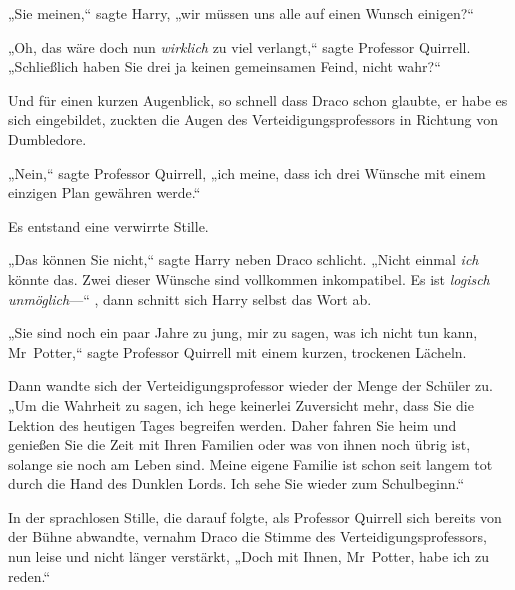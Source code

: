 „Sie meinen,“ sagte Harry, „wir müssen uns alle auf einen Wunsch einigen?“

„Oh, das wäre doch nun \emph{wirklich} zu viel verlangt,“ sagte Professor Quirrell. „Schließlich haben Sie drei ja keinen gemeinsamen Feind, nicht wahr?“

Und für einen kurzen Augenblick, so schnell dass Draco schon glaubte, er habe es sich eingebildet, zuckten die Augen des Verteidigungsprofessors in Richtung von Dumbledore.

„Nein,“ sagte Professor Quirrell, „ich meine, dass ich drei Wünsche mit einem einzigen Plan gewähren werde.“

Es entstand eine verwirrte Stille.

„Das können Sie nicht,“ sagte Harry neben Draco schlicht. „Nicht einmal \emph{ich} könnte das. Zwei dieser Wünsche sind vollkommen inkompatibel. Es ist \emph{logisch unmöglich}—“ , dann schnitt sich Harry selbst das Wort ab.

„Sie sind noch ein paar Jahre zu jung, mir zu sagen, was ich nicht tun kann, Mr~Potter,“ sagte Professor Quirrell mit einem kurzen, trockenen Lächeln.

Dann wandte sich der Verteidigungsprofessor wieder der Menge der Schüler zu. „Um die Wahrheit zu sagen, ich hege keinerlei Zuversicht mehr, dass Sie die Lektion des heutigen Tages begreifen werden. Daher fahren Sie heim und genießen Sie die Zeit mit Ihren Familien oder was von ihnen noch übrig ist, solange sie noch am Leben sind. Meine eigene Familie ist schon seit langem tot durch die Hand des Dunklen Lords. Ich sehe Sie wieder zum Schulbeginn.“

In der sprachlosen Stille, die darauf folgte, als Professor Quirrell sich bereits von der Bühne abwandte, vernahm Draco die Stimme des Verteidigungsprofessors, nun leise und nicht länger verstärkt, „Doch mit Ihnen, Mr~Potter, habe ich zu reden.“

